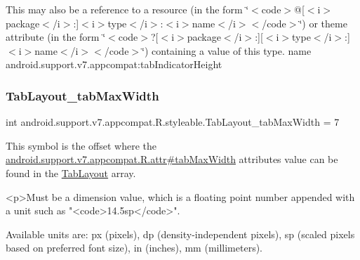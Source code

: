 This may also be a reference to a resource (in the form \char`\"{}$<$code$>$@\mbox{[}$<$i$>$package$<$/i$>$\+:\mbox{]}$<$i$>$type$<$/i$>$\+:$<$i$>$name$<$/i$>$$<$/code$>$\char`\"{}) or theme attribute (in the form \char`\"{}$<$code$>$?\mbox{[}$<$i$>$package$<$/i$>$\+:\mbox{]}\mbox{[}$<$i$>$type$<$/i$>$\+:\mbox{]}$<$i$>$name$<$/i$>$$<$/code$>$\char`\"{}) containing a value of this type.  name android.\+support.\+v7.\+appcompat\+:tab\+Indicator\+Height \mbox{\label{classandroid_1_1support_1_1v7_1_1appcompat_1_1R_1_1styleable_aa2ea2744277660540a1c51be56abcd62}} 
\subsubsection{\texorpdfstring{Tab\+Layout\+\_\+tab\+Max\+Width}{TabLayout\_tabMaxWidth}}
{\footnotesize\ttfamily int android.\+support.\+v7.\+appcompat.\+R.\+styleable.\+Tab\+Layout\+\_\+tab\+Max\+Width = 7\hspace{0.3cm}{\ttfamily [static]}}

This symbol is the offset where the \hyperlink{classandroid_1_1support_1_1v7_1_1appcompat_1_1R_1_1attr_a1202bed5215506aa76adc2844554f4fe}{android.\+support.\+v7.\+appcompat.\+R.\+attr\#tab\+Max\+Width} attribute\textquotesingle{}s value can be found in the \hyperlink{classandroid_1_1support_1_1v7_1_1appcompat_1_1R_1_1styleable_a3c85d0c4cebbccf5b1a16ecfe13938ca}{Tab\+Layout} array.

\begin{DoxyVerb}      <p>Must be a dimension value, which is a floating point number appended with a unit such as "<code>14.5sp</code>".
\end{DoxyVerb}
 Available units are\+: px (pixels), dp (density-\/independent pixels), sp (scaled pixels based on preferred font size), in (inches), mm (millimeters). 

